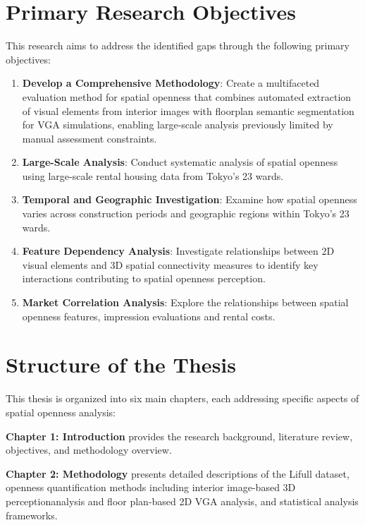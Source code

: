 \section{Primary Research Objectives}
This research aims to address the identified gaps through the following primary objectives:

\begin{enumerate}
    \item \textbf{Develop a Comprehensive Methodology}: Create a multifaceted evaluation method for spatial openness 
    that combines automated extraction of visual elements from interior images with floorplan semantic segmentation 
    for VGA simulations, enabling large-scale analysis previously limited by manual assessment constraints.
    
    \item \textbf{Large-Scale Analysis}: Conduct systematic analysis of spatial openness using large-scale rental 
    housing data from Tokyo's 23 wards.
    
    \item \textbf{Temporal and Geographic Investigation}: Examine how spatial openness varies across construction 
    periods and geographic regions within Tokyo's 23 wards.

    \item \textbf{Feature Dependency Analysis}: Investigate relationships between 2D visual elements and 3D spatial 
    connectivity measures to identify key interactions contributing to spatial openness perception.

    \item \textbf{Market Correlation Analysis}: Explore the relationships between spatial openness features, impression evaluations and rental 
    costs.
\end{enumerate}


\section{Structure of the Thesis}

This thesis is organized into six main chapters, each addressing specific aspects of spatial openness analysis:

\textbf{Chapter 1: Introduction} provides the research background, literature review, objectives, and methodology 
overview.

\textbf{Chapter 2: Methodology} presents detailed descriptions of the Lifull dataset, openness quantification methods 
including interior image-based 3D perceptionanalysis and floor plan-based 2D VGA analysis, and statistical analysis frameworks.

